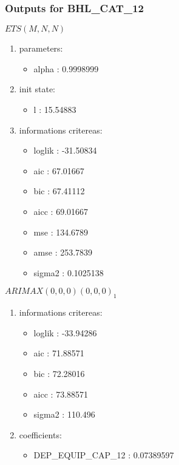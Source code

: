 \documentclass[10pt,a4paper]{article}\usepackage[]{graphicx}\usepackage[]{color}
\newcommand{\AaA}{\_}
\begin{document}
\subsubsection{Outputs for BHL\AaA CAT\AaA 12}
\begin{multicols}{2}


$ ETS(M,N,N) $
\begin{enumerate}
\item parameters:
\begin{itemize}
\item  alpha :  0.9998999 
\end{itemize}
\item init state:
\begin{itemize}
\item  l :  15.54883 
\end{itemize}
\item informations critereas:
\begin{itemize}
\item  loglik :  -31.50834 
\item  aic :  67.01667 
\item  bic :  67.41112 
\item  aicc :  69.01667 
\item  mse :  134.6789 
\item  amse :  253.7839 
\item  sigma2 :  0.1025138 
\end{itemize}
\end{enumerate}

\columnbreak


 $ARIMAX(0,0,0)(0,0,0)_{1}$ 
\begin{enumerate}
\item informations critereas:
\begin{itemize}
\item  loglik :  -33.94286 
\item  aic :  71.88571 
\item  bic :  72.28016 
\item  aicc :  73.88571 
\item  sigma2 :  110.496 
\end{itemize}

\item coefficients:
\begin{itemize}
\item  DEP\AaA EQUIP\AaA CAP\AaA 12 :  0.07389597 
\end{itemize}
\end{enumerate}
\end{multicols}
\end{document}
